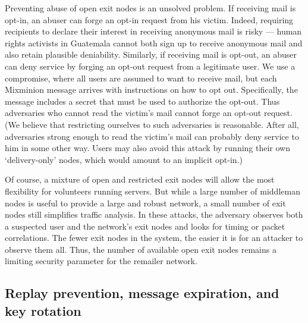 \documentclass[11pt]{IEEEtran}
\begin{document}
Preventing abuse of open exit nodes is an unsolved problem. If
receiving mail is opt-in, an abuser can forge an opt-in request from
his victim. Indeed, requiring recipients to declare their interest
in receiving anonymous mail is risky --- human rights activists in
Guatemala cannot both sign up to receive anonymous mail and also retain
plausible deniability. %
Similarly, if receiving mail is opt-out, an abuser can deny service
by forging an opt-out request from a legitimate user. We use a compromise,
where all users are assumed to want to receive mail, but each Mixminion
message arrives with instructions on how to opt out. Specifically, the
message includes a secret that must be used to authorize the opt-out. Thus
adversaries who cannot read the victim's mail cannot forge an opt-out
request.  (We believe that restricting ourselves to such adversaries is
reasonable.  After all, adversaries strong enough to read the victim's mail
can probably deny service to him in some other way.  Users may also avoid
this attack by running their own `delivery-only' nodes, which would amount to
an implicit opt-in.)


Of course, a mixture of open and restricted exit nodes will allow the
most flexibility for volunteers running servers. But while a large number
of middleman nodes is useful to provide a large and robust network, a
small number of exit nodes still simplifies traffic analysis.
In these attacks, the adversary observes both a suspected user and the
network's exit nodes and looks for timing or packet correlations.  The fewer
exit nodes in the system, the easier it is for an attacker to observe them
all.  Thus, the
number of available open exit nodes remains a limiting security parameter
for the remailer network.

\subsection{Replay prevention, message expiration, and key rotation}
\label{subsec:replay}
\end{document}
